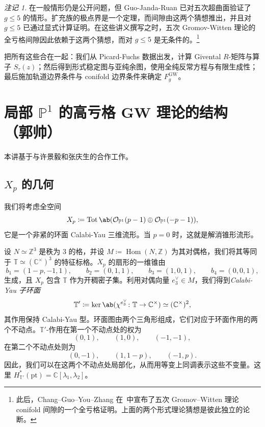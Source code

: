 \documentclass{amsart}
\theoremstyle{definition}
\theoremstyle{remark}
\newtheorem{rmk}[thm]{注记}
\theoremstyle{plain}
\theoremstyle{definition}
\theoremstyle{remark}
\newcommand{\C}{\mathbb{C}}
\newcommand{\Z}{\mathbb{Z}}
\renewcommand{\P}{\mathbb{P}}
\newcommand{\mc}[1]{\mathcal{#1}}
\newcommand{\T}{\mathbb{T}}
\newcommand{\mr}[1]{\mathrm{#1}}
\newcommand{\on}[1]{\operatorname{#1}}
\newcommand{\1}{\mathbf{1}}
\newcommand{\2}{\mathbf{2}}
\newcommand{\3}{\mathbf{3}}
\DeclareMathOperator{\Hom}{Hom}
\begin{document}
\begin{rmk}
    在一般情形仍是公开问题，但 Guo-Janda-Ruan 已对五次超曲面验证了 \(g \leq 5\) 的情形。扩充族的极点界是一个定理，而间隙由这两个猜想推出，并且对 \(g \leq 5\) 已通过显式计算证明。在这些讲义撰写之时，五次 Gromov-Witten 理论的全亏格间隙因此依赖于这两个猜想，而对 \(g \leq 5\) 是无条件的。\footnote{此后，Chang--Guo--You--Zhang 在~\cite{CGYZ2026}中宣布了五次 Gromov--Witten 理论 conifold 间隙的一个全亏格证明。上面的两个形式理论猜想是彼此独立的论断。}
\end{rmk}

把所有这些合在一起：我们从 Picard-Fuchs 数据出发，计算 Givental \(R\)-矩阵与算子 \(S_{\tau}(z)\)；然后得到形式稳定图与亚纯余图，使用全纯反常方程与有限生成性；最后施加轨道边界条件与 conifold 边界条件来确定 \(F_g^{\mr{GW}}\)。\section{\texorpdfstring{局部 \(\P^1\) 的高亏格 GW 理论的结构}{Structure of higher-genus GW theory of local P1} （郭帅）}%
\label{sec:Structure of higher-genus GW theory of local P1 (Shuai Guo)}

本讲基于与许景毅和张庆生的合作工作。

\subsection{\(X_p\) 的几何}%
\label{sub:The geometry of Xp}

我们将考虑全空间
\[ X_p \coloneqq \on{Tot}\ab(\mc{O}_{\P^1}(p-1) \oplus \mc{O}_{\P^1}(-p-1)), \]
它是一个非紧的环面 Calabi-Yau 三维流形。当 \(p = 0\) 时，这就是解消锥形流形。

设 \(N \simeq \Z^3\) 是秩为 \(3\) 的格，并设 \(M \coloneqq \Hom(N,\Z)\) 为其对偶格，我们将其等同于 \(\T \simeq (\C^{\times})^3\) 的特征标格。\(X_p\) 的扇形的一维锥由
\[ b_1 = (1-p,-1,1), \qquad b_2 = (0,1,1), \qquad b_3 = (1,0,1), \qquad b_4 = (0,0,1), \]
生成，且 \(X_p\) 包含 \(\T\) 作为开稠密子集。利用对偶向量 \(e_3^{\vee} \in M\)，我们得到\textit{Calabi-Yau 子环面}
\[ \T' \coloneqq \ker\ab(\chi^{e_3^{\vee}} \colon \T \to \C^{\times}) \simeq (\C^{\times})^2, \]
其作用保持 Calabi-Yau 型。环面图由两个三角形组成，它们对应于环面作用的两个不动点。\(\T'\)-作用在第一个不动点处的权为
\[ (0,1), \qquad (1,0), \qquad (-1,-1), \]
在第二个不动点处则为
\[ (0,-1), \qquad (1,1-p), \qquad (-1,p). \]
因此，我们可以在这两个不动点处局部化，从而用等变上同调表示这些不变量。这里 \(H^*_{\T'}(\mr{pt}) = \C[\lambda_1,\lambda_2]\)。
\end{document}
